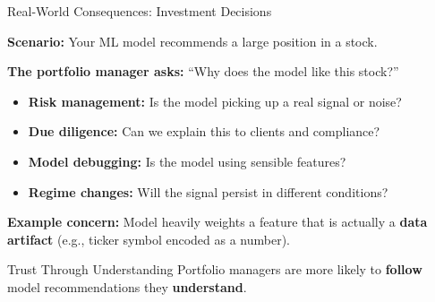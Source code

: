 \documentclass[10pt]{beamer}
\newcommand{\highlight}[1]{\textcolor{AccentOrange}{\textbf{#1}}}
\begin{document}
\begin{frame}{Real-World Consequences: Investment Decisions}

  \textbf{Scenario:} Your ML model recommends a large position in a stock.

  \vspace{1em}
  \textbf{The portfolio manager asks:} ``Why does the model like this stock?''

  \vspace{0.5em}
  \begin{itemize}
    \item \textbf{Risk management:} Is the model picking up a real signal or noise?
    \item \textbf{Due diligence:} Can we explain this to clients and compliance?
    \item \textbf{Model debugging:} Is the model using sensible features?
    \item \textbf{Regime changes:} Will the signal persist in different conditions?
  \end{itemize}

  \vspace{1em}
  \textbf{Example concern:} Model heavily weights a feature that is actually a \highlight{data artifact} (e.g., ticker symbol encoded as a number).

  \vspace{0.5em}
  \begin{block}{Trust Through Understanding}
    Portfolio managers are more likely to \highlight{follow} model recommendations they \highlight{understand}.
  \end{block}
\end{frame}

\end{document}
